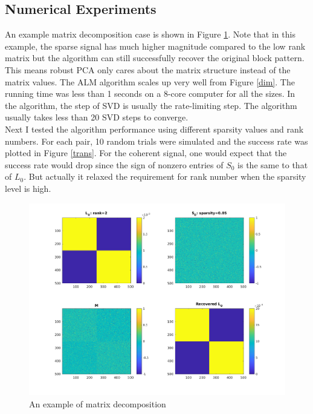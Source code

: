 \documentclass[12pt]{extarticle}
\newcommand{\<}{\langle}
\renewcommand{\>}{\rangle}
\theoremstyle{definition}
\begin{document}
\subsection{Numerical Experiments}
An example matrix decomposition case is shown in Figure \ref{ex}. Note that in this example, the sparse signal has much higher magnitude compared to the low rank matrix but the algorithm can still successfully recover the original block pattern. This means robust PCA only cares about the matrix structure instead of the matrix values. The ALM algorithm scales up very well from Figure \ref{dim}. The running time was less than 1 seconds on a 8-core computer for all the sizes. In the algorithm, the step of SVD is usually the rate-limiting step. The algorithm usually takes less than 20 SVD steps to converge. \\

Next I tested the algorithm performance using different sparsity values and rank numbers. For each pair, 10 random trials were simulated and the success rate was plotted in Figure \ref{trans}. For the coherent signal, one would expect that the success rate would drop since the sign of nonzero entries of $S_0$ is the same to that of $L_0$. But actually it relaxed the requirement for rank number when the sparsity level is high.  \\



\begin{figure}
    \centering
    \includegraphics[width=\textwidth]{PatternCorrupted.png}
    \caption{An example of matrix decomposition}
    \label{ex}
\end{figure}
\end{document}
